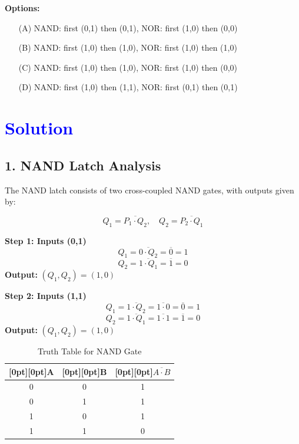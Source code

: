 \documentclass[a4paper,12pt]{article}
\begin{document}
\vspace{1cm}
\textbf{Options:}
\begin{enumerate}
    \item[(A)] NAND: first (0,1) then (0,1), NOR: first (1,0) then (0,0)
    \item[(B)] NAND: first (1,0) then (1,0), NOR: first (1,0) then (1,0)
    \item[(C)] NAND: first (1,0) then (1,0), NOR: first (1,0) then (0,0)
    \item[(D)] NAND: first (1,0) then (1,1), NOR: first (0,1) then (0,1)
\end{enumerate}

\section*{\textcolor{blue}{Solution}}

\subsection*{1. NAND Latch Analysis}
The NAND latch consists of two cross-coupled NAND gates, with outputs given by:

\[
Q_1 = \overline{P_1 \cdot Q_2}, \quad Q_2 = \overline{P_2 \cdot Q_1}
\]

\textbf{Step 1: Inputs (0,1)}
\[
Q_1 = \overline{0 \cdot Q_2} = \overline{0} = 1
\]
\[
Q_2 = \overline{1 \cdot Q_1} = \overline{1} = 0
\]
\textbf{Output:} \( (Q_1, Q_2) = (1,0) \)

\textbf{Step 2: Inputs (1,1)}
\[
Q_1 = \overline{1 \cdot Q_2} = \overline{1 \cdot 0} = \overline{0} = 1
\]
\[
Q_2 = \overline{1 \cdot Q_1} = \overline{1 \cdot 1} = \overline{1} = 0
\]
\textbf{Output:} \( (Q_1, Q_2) = (1,0) \)

\begin{table}[h]
\centering
\begin{tabular}{|c|c|c|}
\hline
\raisebox{-0.5ex}[0pt][0pt]{A} & \raisebox{-0.5ex}[0pt][0pt]{B} & \raisebox{-0.5ex}[0pt][0pt]{$\overline{A \cdot B}$} \\  %
\hline
0 & 0 & 1 \\
0 & 1 & 1 \\
1 & 0 & 1 \\
1 & 1 & 0 \\
\hline
\end{tabular}
\caption{Truth Table for NAND Gate}
\end{table}

\vspace{-0.8cm}
\end{document}
